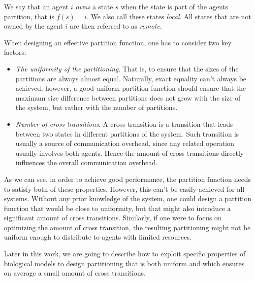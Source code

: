 We say that an agent $i$ \emph{owns} a state $s$ when the state is part of the agents partition, that is $f(s) = i$. We also call these states \emph{local}. All states that are not owned by the agent $i$ are then referred to as \emph{remote}.

When designing an effective partition function, one has to consider two key factors:
\begin{itemize}
	\item  \emph{The uniformity of the partitioning}. That is, to ensure that the sizes of the partitions are always almost equal. Naturally, exact equality can't always be achieved, however, a good uniform partition function should ensure that the maximum size difference between partitions does not grow with the size of the system, but rather with the number of partitions.
	\item \emph{Number of cross transitions}. A cross transition is a transition that leads between two states in different partitions of the system. Such transition is usually a source of communication overhead, since any related operation usually involves both agents. Hence the amount of cross transitions directly influences the overall communication overhead.
\end{itemize}

As we can see, in order to achieve good performance, the partition function needs to satisfy both of these properties. However, this can't be easily achieved for all systems. Without any prior knowledge of the system, one could design a partition function that would be close to uniformity, but that might also introduce a significant amount of cross transitions. Similarly, if one were to focus on optimizing the amount of cross transition, the resulting partitioning might not be uniform enough to distribute to agents with limited resources.

Later in this work, we are going to describe how to exploit specific properties of biological models to design partitioning that is both uniform and which ensures on average a small amount of cross transitions.